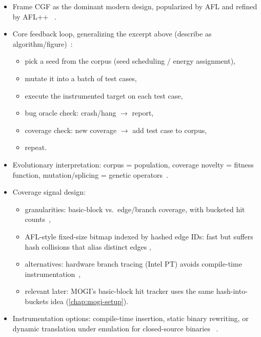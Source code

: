 \begin{itemize}
  \item Frame CGF as the dominant modern design, popularized by AFL and refined by
    AFL++~\cite{fioraldi_afl_nodate} .
  \item Core feedback loop, generalizing the excerpt above (describe as
    algorithm/figure)~\cite{manes_art_2019,fioraldi_afl_nodate}:
    \begin{itemize}
      \item pick a seed from the corpus (seed scheduling / energy assignment),
      \item mutate it into a batch of test cases,
      \item execute the instrumented target on each test case,
      \item bug oracle check: crash/hang $\rightarrow$ report,
      \item coverage check: new coverage $\rightarrow$ add test case to corpus,
      \item repeat.
    \end{itemize}
  \item Evolutionary interpretation: corpus = population, coverage novelty = fitness function,
    mutation/splicing = genetic operators~\cite{she_neuzz_2019,manes_art_2019}.
  \item Coverage signal design:
    \begin{itemize}
      \item granularities: basic-block vs.\ edge/branch coverage, with bucketed hit
        counts~\cite{fioraldi_afl_nodate},
      \item AFL-style fixed-size bitmap indexed by hashed edge IDs: fast but suffers hash
        collisions that alias distinct edges
        ,
      \item alternatives: hardware branch tracing (Intel PT) avoids compile-time
        instrumentation~\cite{zhang_ptfuzz_2018},
      \item relevant later: MOGI's basic-block hit tracker uses the same hash-into-buckets idea
        (\cref{chap:mogi-setup}).
    \end{itemize}
  \item Instrumentation options: compile-time insertion, static binary rewriting, or dynamic
    translation under emulation for closed-source binaries~\cite{fioraldi_afl_nodate}
    .

\end{itemize}
